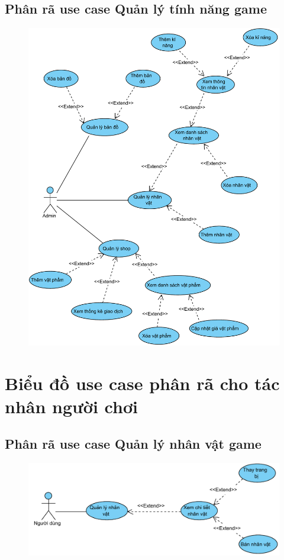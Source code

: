 \documentclass[3p]{elsarticle}
\begin{document}
\subsection{Phân rã use case Quản lý tính năng game}
\begin{figure}[!htbp]
	\hspace*{-.5in}
	\centering
	\includegraphics[scale=.7]{images/usecases/admin_GameManagement.pdf}
\end{figure}
\newpage
\section{Biểu đồ use case phân rã cho tác nhân người chơi}
\subsection{Phân rã use case Quản lý nhân vật game}
\begin{figure}[!htbp]
	\hspace*{-.5in}
	\centering
	\includegraphics[scale=.7]{images/usecases/gamer_CharacterManagement.pdf}
\end{figure}
\end{document}
